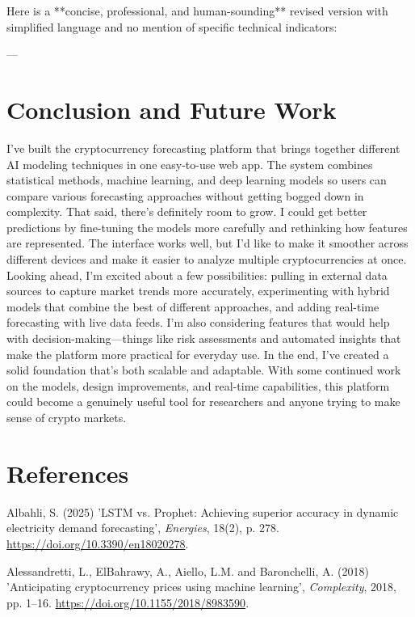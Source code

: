 \documentclass[12pt,a4paper]{report}
\begin{document}
Here is a **concise, professional, and human-sounding** revised version with simplified language and no mention of specific technical indicators:

---

\chapter*{Conclusion and Future Work}

I've built the cryptocurrency forecasting platform that brings together different AI modeling techniques in one easy-to-use web app. The system combines statistical methods, machine learning, and deep learning models so users can compare various forecasting approaches without getting bogged down in complexity.
That said, there's definitely room to grow. I could get better predictions by fine-tuning the models more carefully and rethinking how features are represented. The interface works well, but I'd like to make it smoother across different devices and make it easier to analyze multiple cryptocurrencies at once.
Looking ahead, I'm excited about a few possibilities: pulling in external data sources to capture market trends more accurately, experimenting with hybrid models that combine the best of different approaches, and adding real-time forecasting with live data feeds. I'm also considering features that would help with decision-making—things like risk assessments and automated insights that make the platform more practical for everyday use.
In the end, I've created a solid foundation that's both scalable and adaptable. With some continued work on the models, design improvements, and real-time capabilities, this platform could become a genuinely useful tool for researchers and anyone trying to make sense of crypto markets.


\chapter*{References}

\noindent Albahli, S. (2025) 'LSTM vs. Prophet: Achieving superior accuracy in dynamic electricity demand forecasting', \textit{Energies}, 18(2), p. 278. \url{https://doi.org/10.3390/en18020278}.

\vspace{0.3cm}
\noindent Alessandretti, L., ElBahrawy, A., Aiello, L.M. and Baronchelli, A. (2018) 'Anticipating cryptocurrency prices using machine learning', \textit{Complexity}, 2018, pp. 1--16. \url{https://doi.org/10.1155/2018/8983590}.
\end{document}
